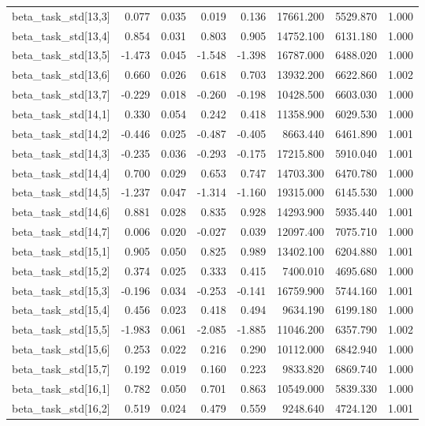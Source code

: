 \begin{tabular}{lrrrrrrr}
beta\_task\_std[13,3] & 0.077 & 0.035 & 0.019 & 0.136 & 17661.200 & 5529.870 & 1.000 \\
beta\_task\_std[13,4] & 0.854 & 0.031 & 0.803 & 0.905 & 14752.100 & 6131.180 & 1.000 \\
beta\_task\_std[13,5] & -1.473 & 0.045 & -1.548 & -1.398 & 16787.000 & 6488.020 & 1.000 \\
beta\_task\_std[13,6] & 0.660 & 0.026 & 0.618 & 0.703 & 13932.200 & 6622.860 & 1.002 \\
beta\_task\_std[13,7] & -0.229 & 0.018 & -0.260 & -0.198 & 10428.500 & 6603.030 & 1.000 \\
beta\_task\_std[14,1] & 0.330 & 0.054 & 0.242 & 0.418 & 11358.900 & 6029.530 & 1.000 \\
beta\_task\_std[14,2] & -0.446 & 0.025 & -0.487 & -0.405 & 8663.440 & 6461.890 & 1.001 \\
beta\_task\_std[14,3] & -0.235 & 0.036 & -0.293 & -0.175 & 17215.800 & 5910.040 & 1.001 \\
beta\_task\_std[14,4] & 0.700 & 0.029 & 0.653 & 0.747 & 14703.300 & 6470.780 & 1.000 \\
beta\_task\_std[14,5] & -1.237 & 0.047 & -1.314 & -1.160 & 19315.000 & 6145.530 & 1.000 \\
beta\_task\_std[14,6] & 0.881 & 0.028 & 0.835 & 0.928 & 14293.900 & 5935.440 & 1.001 \\
beta\_task\_std[14,7] & 0.006 & 0.020 & -0.027 & 0.039 & 12097.400 & 7075.710 & 1.000 \\
beta\_task\_std[15,1] & 0.905 & 0.050 & 0.825 & 0.989 & 13402.100 & 6204.880 & 1.001 \\
beta\_task\_std[15,2] & 0.374 & 0.025 & 0.333 & 0.415 & 7400.010 & 4695.680 & 1.000 \\
beta\_task\_std[15,3] & -0.196 & 0.034 & -0.253 & -0.141 & 16759.900 & 5744.160 & 1.001 \\
beta\_task\_std[15,4] & 0.456 & 0.023 & 0.418 & 0.494 & 9634.190 & 6199.180 & 1.000 \\
beta\_task\_std[15,5] & -1.983 & 0.061 & -2.085 & -1.885 & 11046.200 & 6357.790 & 1.002 \\
beta\_task\_std[15,6] & 0.253 & 0.022 & 0.216 & 0.290 & 10112.000 & 6842.940 & 1.000 \\
beta\_task\_std[15,7] & 0.192 & 0.019 & 0.160 & 0.223 & 9833.820 & 6869.740 & 1.000 \\
beta\_task\_std[16,1] & 0.782 & 0.050 & 0.701 & 0.863 & 10549.000 & 5839.330 & 1.000 \\
beta\_task\_std[16,2] & 0.519 & 0.024 & 0.479 & 0.559 & 9248.640 & 4724.120 & 1.001 \\

\end{tabular}
